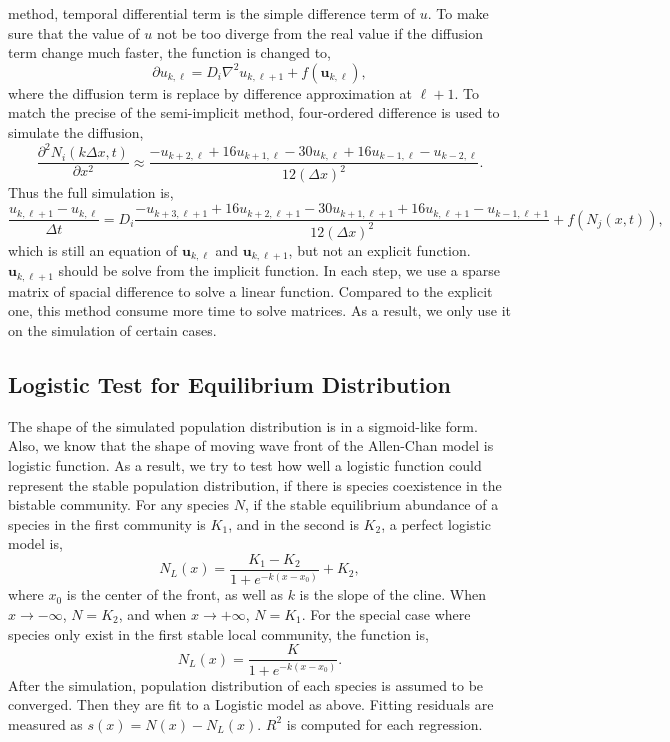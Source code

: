 method, temporal differential term is the simple difference term of $u$. To make sure that the value of $u$ not be too diverge from the real value if the diffusion term change much faster, the function is changed to, \begin{equation} \partial u_{k,\ell} = D_{i} \nabla^2 u_{k,\ell+1} + f(\mathbf{u}_{k,\ell}), \end{equation} where the diffusion term is replace by difference approximation at $\ell+1$. To match the precise of the semi-implicit method, four-ordered difference is used to simulate the diffusion, \begin{equation*} \frac{\partial^2 N_i(k \Delta x,t)}{\partial x^2} \approx \frac{-u_{k+2,\ell} + 16 u_{k+1,\ell} - 30 u_{k,\ell} + 16 u_{k-1,\ell} - u_{k-2,\ell}}{12(\Delta x)^2}. \end{equation*} Thus the full simulation is, \begin{equation*} \frac{u_{k,\ell+1} - u_{k,\ell}}{\Delta t} = D_{i} \frac{-u_{k+3,\ell+1} + 16 u_{k+2,\ell+1} - 30 u_{k+1,\ell+1} + 16 u_{k,\ell+1} - u_{k-1,\ell+1}}{12(\Delta x)^2} + f(N_j(x,t)), \end{equation*} which is still an equation of $\mathbf{u}_{k,\ell}$ and $\mathbf{u}_{k,\ell+1}$, but not an explicit function. $\mathbf{u}_{k,\ell+1}$ should be solve from the implicit function. In each step, we use a sparse matrix of spacial difference to solve a linear function. Compared to the explicit one, this method consume more time to solve matrices. As a result, we only use it on the simulation of certain cases.

\subsection{Logistic Test for Equilibrium Distribution} The shape of the simulated population distribution is in a sigmoid-like form. Also, we know that the shape of moving wave front of the Allen-Chan model is logistic function. As a result, we try to test how well a logistic function could represent the stable population distribution, if there is species coexistence in the bistable community. For any species $N$, if the stable equilibrium abundance of a species in the first community is $K_1$, and in the second is $K_2$, a perfect logistic model is, \begin{equation} N_L(x) = \frac{K_1 - K_2}{1 + e^{-k(x-x_0)}} + K_2, \end{equation} where $x_0$ is the center of the front, as well as $k$ is the slope of the cline. When $x\rightarrow -\infty$, $N = K_2$, and when $x \rightarrow +\infty$, $N = K_1$. For the special case where species only exist in the first stable local community, the function is, \begin{equation*} N_L(x) = \frac{K}{1 + e^{-k(x-x_0)}}. \end{equation*} After the simulation, population distribution of each species is assumed to be converged. Then they are fit to a Logistic model as above. Fitting residuals are measured as $s(x) = N(x) - N_L(x)$. $R^2$ is computed for each regression.

